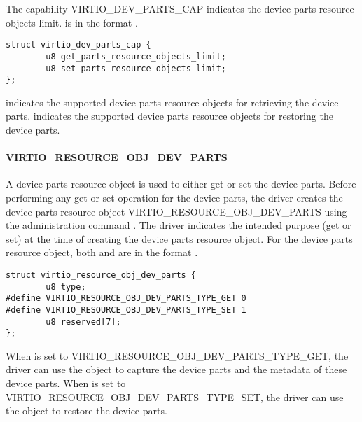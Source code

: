 The capability VIRTIO_DEV_PARTS_CAP indicates the device parts resource objects limit.
 is in the format .

\begin{lstlisting}
struct virtio_dev_parts_cap {
        u8 get_parts_resource_objects_limit;
        u8 set_parts_resource_objects_limit;
};
\end{lstlisting}

 indicates the supported device parts
resource objects for retrieving the device parts.
 indicates the supported device parts
resource objects for restoring the device parts.

\paragraph{VIRTIO_RESOURCE_OBJ_DEV_PARTS}\label{par:Basic Facilities of a Virtio Device / Device groups / Group administration commands / Device parts / VIRTIO-RESOURCE-OBJ-DEV-PARTS}

A device parts resource object is used to either get or set the device parts.
Before performing any get or set operation for the device parts, the driver
creates the device parts resource object
VIRTIO_RESOURCE_OBJ_DEV_PARTS using the administration command
.
The driver indicates the intended purpose (get or set) at the time of creating the
device parts resource object.
For the device parts resource object, both  and
 are in the format
.

\begin{lstlisting}
struct virtio_resource_obj_dev_parts {
        u8 type;
#define VIRTIO_RESOURCE_OBJ_DEV_PARTS_TYPE_GET 0
#define VIRTIO_RESOURCE_OBJ_DEV_PARTS_TYPE_SET 1
        u8 reserved[7];
};
\end{lstlisting}

When  is set to VIRTIO_RESOURCE_OBJ_DEV_PARTS_TYPE_GET,
the driver can use the object to capture the device parts and the metadata of
these device parts. When  is set to
VIRTIO_RESOURCE_OBJ_DEV_PARTS_TYPE_SET, the driver can use the
object to restore the device parts.

